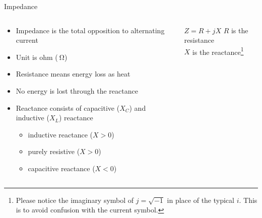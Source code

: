 \documentclass{beamer}
\begin{document}
\begin{frame}[label=impedance]{Impedance}
\begin{columns}
  \begin{column}{0.58\textwidth}
   \begin{itemize}
    \item Impedance is the total opposition to alternating current
    \item Unit is ohm ($\SI{}{\ohm}$)
    \item Resistance means energy loss as heat
    \item No energy is lost through the reactance
    \item Reactance consists of capacitive ($X_C$) and inductive ($X_L$) reactance
     \begin{itemize}
      \item inductive reactance ($X > 0$)
      \item purely resistive ($X > 0$)
      \item capacitive reactance ($X < 0$)
     \end{itemize}
   \end{itemize}
  \end{column}
  \begin{column}{0.38\textwidth}
    \begin{block}{$Z = R + jX$}
        $R$ is the resistance \\
        $X$ is the reactance\footnote{Please notice the imaginary symbol of $j = \sqrt{-1}$ in place of the typical $i$. This is to avoid confusion with the current symbol.}
    \end{block}
  \end{column}
\end{columns}
\end{frame}
\end{document}
